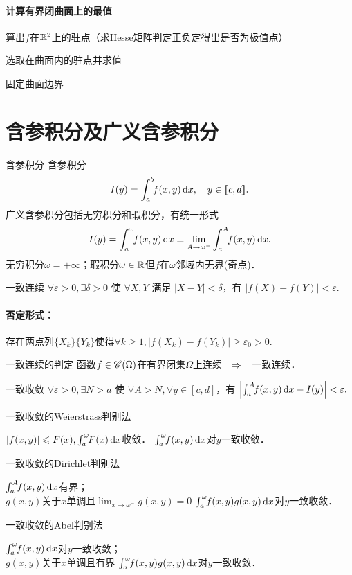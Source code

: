 \paragraph{计算有界闭曲面上的最值}
\begin{compactenum}[(1)]
	\item 算出$f$在$\RR^2$上的驻点（求Hesse矩阵判定正负定得出是否为极值点）
	\item 选取在曲面内的驻点并求值
	\item 固定曲面边界
\end{compactenum}
\newpage
\section{含参积分及广义含参积分}
\begin{definition}{含参积分}{}
	含参积分
	\[I(y)=\int_a^b\bs3f(x,y)\d x,\quad y\in\zkh{c,d}.\]
	广义含参积分包括无穷积分和瑕积分，有统一形式
	\[I(y)=\int_a^\omega\bs3f(x,y)\d x\equiv\lim_{A\to\omega^-}\int_a^A\bs3f(x,y)\d x.\]
	无穷积分$\omega=+\infty$；瑕积分$\omega\in\RR$但$f$在$\omega$邻域内无界(奇点)．
\end{definition}
\begin{definition}{一致连续}{}
	$\forall\varepsilon>0,\exists\delta>0$ 使 $\forall X,Y$ 满足 $\vert X-Y\vert<\delta$，有 $|f(X)-f(Y)|<\varepsilon.$
	\tcblower
	\paragraph*{否定形式：}存在两点列$\{X_k\}\{Y_k\}$使得$\forall k\geqslant 1,|f(X_k)-f(Y_k)|\geqslant\varepsilon_0>0.$
\end{definition}
\begin{theorem}{一致连续的判定}{}
	函数$f\in\sC(\Omega)$在有界闭集$\Omega$上连续$\thus$一致连续．
\end{theorem}
\begin{definition}{一致收敛}{}
	$\forall\varepsilon>0,\exists N>a$ 使 $\forall A>N,\forall y\in[c,d]$，有 $\left|\int_a^A\bs3f(x,y)\d x-I(y)\right|<\varepsilon.$
\end{definition}
\begin{theorem}{一致收敛的Weierstrass判别法}{}
	\begin{center}
		$|f(x,y)|\leqslant F(x),\int_a^\omega\bs3F(x)\d x$收敛．
		\vthus
		$\int_a^\omega\bs3f(x,y)\d x$对$y$一致收敛．
	\end{center}
\end{theorem}
\begin{theorem}{一致收敛的Dirichlet判别法}{}
	\begin{center}
		$\int_a^A\bs3f(x,y)\d x$有界；\\
		$g(x,y)$关于$x$单调且$\lim_{x\to\omega^-}g(x,y)=0$
		\vthus
		$\int_a^\omega\bs3f(x,y)g(x,y)\d x$对$y$一致收敛．
	\end{center}
\end{theorem}
\begin{theorem}{一致收敛的Abel判别法}{}
	\begin{center}
		$\int_a^\omega\bs3f(x,y)\d x$对$y$一致收敛；\\
		$g(x,y)$关于$x$单调且有界
		\vthus
		$\int_a^\omega\bs3f(x,y)g(x,y)\d x$对$y$一致收敛．
	\end{center}
\end{theorem}
